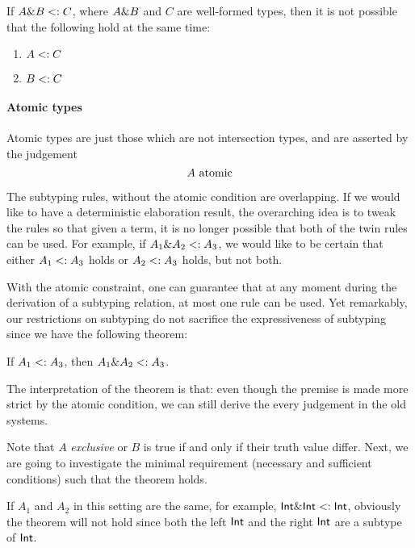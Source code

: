 
\begin{lemma}
  \label{unique-subtype-contributor}
  If $A \& B <: C$, where $A \& B$ and $C$ are well-formed types,
  then it is not possible that the following hold at the same time:
\begin{enumerate}
\item $A <: C$
\item $B <: C$
\end{enumerate}
\end{lemma}

\paragraph{Atomic types} Atomic types are just those which are not intersection
types, and are asserted by the judgement \[ A \ \text{atomic} \]

The subtyping rules, without the atomic condition are overlapping. If we would
like to have a deterministic elaboration result, the overarching idea is to
tweak the rules so that given a term, it is no longer possible that both of the
twin rules can be used. For example, if $A_1 \& A_2 <: A_3$, we would
like to be certain that either $A_1 <: A_3$ holds or $A_2 <: A_3$
holds, but not both.

With the atomic constraint, one can guarantee that at any moment during the
derivation of a subtyping relation, at most one rule can be used. Yet
remarkably, our restrictions on subtyping do not sacrifice the expressiveness of
subtyping since we have the following theorem:
\begin{theorem}
  If $A_1 <: A_3$, then $A_1 \& A_2 <: A_3$.
\end{theorem}

The interpretation of the theorem is that: even though the premise is made more
strict by the atomic condition, we can still derive the every judgement in the
old systems. 

Note that $A$ \emph{exclusive} or $B$ is true if and only if their truth value
differ. Next, we are going to investigate the minimal requirement (necessary and
sufficient conditions) such that the theorem holds.

If $A_1$ and $A_2$ in this setting are the same, for example,
$\textsf{Int} \& \textsf{Int} <: \textsf{Int}$, obviously the theorem will
not hold since both the left $\textsf{Int}$ and the right $\textsf{Int}$ are a
subtype of $\textsf{Int}$.

